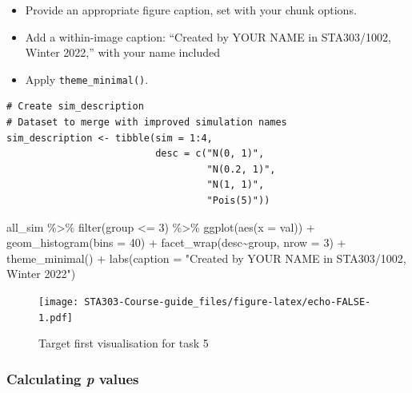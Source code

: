 \documentclass[
  openany]{book}
\newenvironment{Shaded}{\begin{snugshade}}{\end{snugshade}}
\newcommand{\AttributeTok}[1]{\textcolor[rgb]{0.77,0.63,0.00}{#1}}
\newcommand{\DecValTok}[1]{\textcolor[rgb]{0.00,0.00,0.81}{#1}}
\newcommand{\FunctionTok}[1]{\textcolor[rgb]{0.00,0.00,0.00}{#1}}
\newcommand{\NormalTok}[1]{#1}
\newcommand{\SpecialCharTok}[1]{\textcolor[rgb]{0.00,0.00,0.00}{#1}}
\newcommand{\StringTok}[1]{\textcolor[rgb]{0.31,0.60,0.02}{#1}}
\providecommand{\tightlist}{%
  \setlength{\itemsep}{0pt}\setlength{\parskip}{0pt}}
\begin{document}
\begin{itemize}
  \begin{itemize}
  \tightlist
  \item
    Provide an appropriate figure caption, set with your chunk options.
  \item
    Add a within-image caption: ``Created by YOUR NAME in STA303/1002, Winter 2022,'' with your name included
  \item
    Apply \texttt{theme\_minimal()}.
  \end{itemize}
\end{itemize}

\begin{verbatim}
# Create sim_description
# Dataset to merge with improved simulation names
sim_description <- tibble(sim = 1:4, 
                          desc = c("N(0, 1)",
                                   "N(0.2, 1)",
                                   "N(1, 1)",
                                   "Pois(5)"))
\end{verbatim}

\begin{Shaded}
\begin{Highlighting}[]
\NormalTok{all\_sim }\SpecialCharTok{\%\textgreater{}\%} 
  \FunctionTok{filter}\NormalTok{(group }\SpecialCharTok{\textless{}=} \DecValTok{3}\NormalTok{) }\SpecialCharTok{\%\textgreater{}\%}
  \FunctionTok{ggplot}\NormalTok{(}\FunctionTok{aes}\NormalTok{(}\AttributeTok{x =}\NormalTok{ val)) }\SpecialCharTok{+}
  \FunctionTok{geom\_histogram}\NormalTok{(}\AttributeTok{bins =} \DecValTok{40}\NormalTok{) }\SpecialCharTok{+}
  \FunctionTok{facet\_wrap}\NormalTok{(desc}\SpecialCharTok{\textasciitilde{}}\NormalTok{group, }\AttributeTok{nrow =} \DecValTok{3}\NormalTok{) }\SpecialCharTok{+}
  \FunctionTok{theme\_minimal}\NormalTok{() }\SpecialCharTok{+}
  \FunctionTok{labs}\NormalTok{(}\AttributeTok{caption =} \StringTok{"Created by YOUR NAME in STA303/1002, Winter 2022"}\NormalTok{)}
\end{Highlighting}
\end{Shaded}

\begin{figure}
\centering
\texttt{[image: STA303-Course-guide\_files/figure-latex/echo-FALSE-1.pdf]}
\caption{\label{fig:echo-FALSE}Target first visualisation for task 5}
\end{figure}

\hypertarget{calculating-p-values}{%
\subsubsection{\texorpdfstring{Calculating \emph{p} values}{Calculating p values}}\label{calculating-p-values}}
\end{document}
